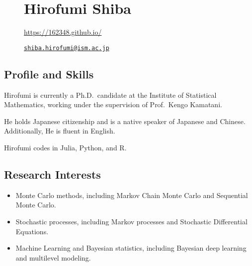 \documentclass[
  11pt,
]{article}
\date{}
\begin{document}
\begin{figure}

\begin{minipage}{0.50\linewidth}

\section{\texorpdfstring{\Huge Hirofumi
Shiba}{Hirofumi Shiba}}\label{hirofumi-shiba}

\end{minipage}%
%
\begin{minipage}{0.50\linewidth}

\color{minty}

\hfill {} \url{https://162348.github.io/}

\par

\hfill {}
\href{mailto:shiba.hirofumi@ism.ac.jp}{\nolinkurl{shiba.hirofumi@ism.ac.jp}}\end{minipage}%

\end{figure}%

\vspace{-1em}

\subsection{Profile and Skills}\label{profile-and-skills}

Hirofumi is currently a Ph.D.~candidate at the Institute of Statistical
Mathematics, working under the supervision of Prof.~Kengo Kamatani.

He holds Japanese citizenship and is a native speaker of Japanese and
Chinese. Additionally, He is fluent in English.

Hirofumi codes in Julia, Python, and R.

\subsection{Research Interests}\label{research-interests}

\begin{itemize}
\item
  Monte Carlo methods, including Markov Chain Monte Carlo and Sequential
  Monte Carlo.
\item
  Stochastic processes, including Markov processes and Stochastic
  Differential Equations.
\item
  Machine Learning and Bayesian statistics, including Bayesian deep
  learning and multilevel modeling.
\end{itemize}
\end{document}
